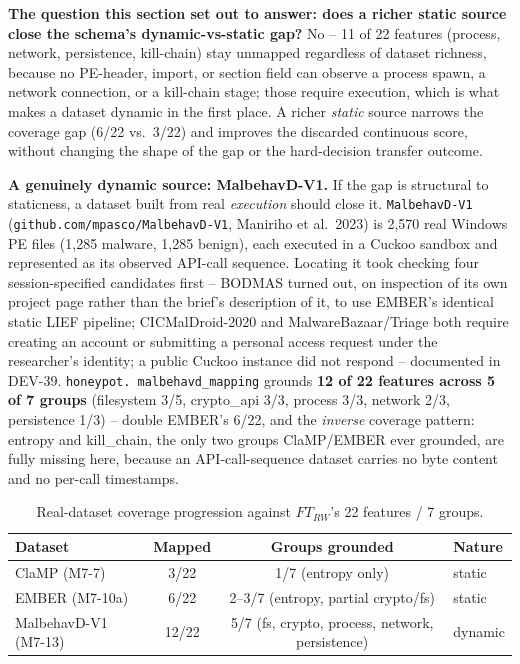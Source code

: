 \documentclass[conference]{IEEEtran}
\begin{document}
\textbf{The question this section set out to answer: does a richer static source close the
schema's dynamic-vs-static gap?} No -- 11 of 22 features (process, network, persistence,
kill-chain) stay unmapped regardless of dataset richness, because no PE-header, import, or section
field can observe a process spawn, a network connection, or a kill-chain stage; those require
execution, which is what makes a dataset dynamic in the first place. A richer \emph{static} source
narrows the coverage gap (6/22 vs.\ 3/22) and improves the discarded continuous score, without
changing the shape of the gap or the hard-decision transfer outcome.

\textbf{A genuinely dynamic source: MalbehavD-V1.} If the gap is structural to staticness, a
dataset built from real \emph{execution} should close it. \texttt{MalbehavD-V1}
(\texttt{github.com/mpasco/MalbehavD-V1}, Maniriho et al.\ 2023) is 2{,}570 real Windows PE files
(1{,}285 malware, 1{,}285 benign), each executed in a Cuckoo sandbox and represented as its
observed API-call sequence. Locating it took checking four session-specified candidates first --
BODMAS turned out, on inspection of its own project page rather than the brief's description of
it, to use EMBER's identical static LIEF pipeline; CICMalDroid-2020 and MalwareBazaar/Triage both
require creating an account or submitting a personal access request under the researcher's
identity; a public Cuckoo instance did not respond -- documented in DEV-39. \texttt{honeypot.
malbehavd\_mapping} grounds \textbf{12 of 22 features across 5 of 7 groups} (filesystem 3/5,
crypto\_api 3/3, process 3/3, network 2/3, persistence 1/3) -- double EMBER's 6/22, and the
\emph{inverse} coverage pattern: entropy and kill\_chain, the only two groups ClaMP/EMBER ever
grounded, are fully missing here, because an API-call-sequence dataset carries no byte content and
no per-call timestamps.

\begin{table}[h]
\centering
\caption{Real-dataset coverage progression against $FT_{RW}$'s 22 features / 7 groups.}
\label{tab:m7-13-coverage}
\footnotesize
\begin{tabular}{lccl}
\hline
\textbf{Dataset} & \textbf{Mapped} & \textbf{Groups grounded} & \textbf{Nature} \\
\hline
ClaMP (M7-7)         & 3/22  & 1/7 (entropy only) & static \\
EMBER (M7-10a)        & 6/22  & 2--3/7 (entropy, partial crypto/fs) & static \\
MalbehavD-V1 (M7-13)  & 12/22 & 5/7 (fs, crypto, process, network, persistence) & dynamic \\
\hline
\end{tabular}
\end{table}
\end{document}
